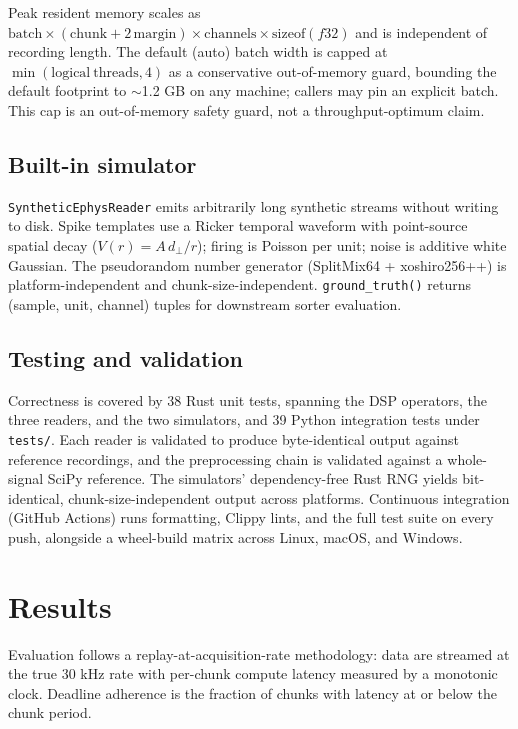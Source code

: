 \documentclass[a4paper,num-refs,gigabyte]{oup-contemporary}
\begin{document}
Peak resident memory scales as $\mathrm{batch} \times (\mathrm{chunk} + 2\,\mathrm{margin}) \times \mathrm{channels} \times \mathrm{sizeof}(f32)$ and is independent of recording length. The default (auto) batch width is capped at $\min(\mathrm{logical\ threads}, 4)$ as a conservative out-of-memory guard, bounding the default footprint to $\sim$1.2 GB on any machine; callers may pin an explicit batch. This cap is an out-of-memory safety guard, not a throughput-optimum claim.

\subsection{Built-in simulator}

\texttt{SyntheticEphysReader} emits arbitrarily long synthetic streams without writing to disk. Spike templates use a Ricker temporal waveform with point-source spatial decay ($V(r) = A\,d_\perp / r$); firing is Poisson per unit; noise is additive white Gaussian. The pseudorandom number generator (SplitMix64 + xoshiro256++) is platform-independent and chunk-size-independent. \texttt{ground\_truth()} returns (sample, unit, channel) tuples for downstream sorter evaluation.

\subsection{Testing and validation}

Correctness is covered by 38 Rust unit tests, spanning the DSP operators, the three readers, and the two simulators, and 39 Python integration tests under \texttt{tests/}. Each reader is validated to produce byte-identical output against reference recordings, and the preprocessing chain is validated against a whole-signal SciPy reference. The simulators' dependency-free Rust RNG yields bit-identical, chunk-size-independent output across platforms. Continuous integration (GitHub Actions) runs formatting, Clippy lints, and the full test suite on every push, alongside a wheel-build matrix across Linux, macOS, and Windows.

\section{Results}

Evaluation follows a replay-at-acquisition-rate methodology: data are streamed at the true 30 kHz rate with per-chunk compute latency measured by a monotonic clock. Deadline adherence is the fraction of chunks with latency at or below the chunk period.
\end{document}
